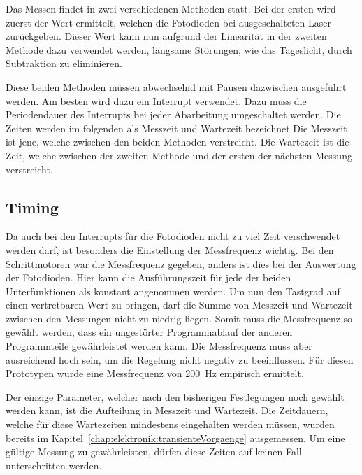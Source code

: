 Das Messen findet in zwei verschiedenen Methoden statt.
Bei der ersten wird zuerst der Wert ermittelt, welchen die Fotodioden bei ausgeschalteten Laser zurückgeben.
Dieser Wert kann nun aufgrund der Linearität in der zweiten Methode dazu verwendet werden, langsame Störungen, wie das Tageslicht, durch Subtraktion zu eliminieren.

Diese beiden Methoden müssen abwechselnd mit Pausen dazwischen ausgeführt werden.
Am besten wird dazu ein Interrupt verwendet.
Dazu muss die Periodendauer des Interrupts bei jeder Abarbeitung umgeschaltet werden.
Die Zeiten werden im folgenden als Messzeit und Wartezeit bezeichnet
Die Messzeit ist jene, welche zwischen den beiden Methoden verstreicht.
Die Wartezeit ist die Zeit, welche zwischen der zweiten Methode und der ersten der nächsten Messung verstreicht.


\subsection{Timing}
Da auch bei den Interrupts für die Fotodioden nicht zu viel Zeit verschwendet werden darf, ist besonders die Einstellung der Messfrequenz wichtig.
Bei den Schrittmotoren war die Messfrequenz gegeben, anders ist dies bei der Auswertung der Fotodioden.
Hier kann die Ausführungszeit für jede der beiden Unterfunktionen als konstant angenommen werden.
Um nun den Tastgrad auf einen vertretbaren Wert zu bringen, darf die Summe von Messzeit und Wartezeit zwischen den Messungen nicht zu niedrig liegen.
Somit muss die Messfrequenz so gewählt werden, dass ein ungestörter Programmablauf der anderen Programmteile gewährleistet werden kann.
Die Messfrequenz muss aber ausreichend hoch sein, um die Regelung nicht negativ zu beeinflussen.
Für diesen Prototypen wurde eine Messfrequenz von 200~Hz empirisch ermittelt.

Der einzige Parameter, welcher nach den bisherigen Festlegungen noch gewählt werden kann, ist die Aufteilung in Messzeit und Wartezeit.
Die Zeitdauern, welche für diese Wartezeiten mindestens eingehalten werden müssen, wurden bereits im Kapitel~\ref{chap:elektronik:transienteVorgaenge} ausgemessen.
Um eine gültige Messung zu gewährleisten, dürfen diese Zeiten auf keinen Fall unterschritten werden.

